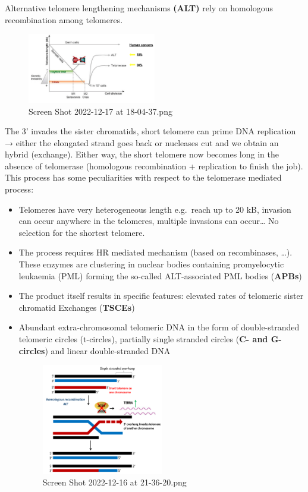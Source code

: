 Alternative telomere lengthening mechanisms \textbf{(ALT) }rely on
homologous recombination among telomeres.

\begin{figure}
\centering
\includegraphics[width=0.5\textwidth]{../_resources/Screen_Shot_2022-12-17_at_18-04-37.png}
\caption{Screen Shot 2022-12-17 at 18-04-37.png}
\end{figure}

The 3' invades the sister chromatids, short telomere can prime DNA
replication → either the elongated strand goes back or nucleases cut and
we obtain an hybrid (exchange). Either way, the short telomere now
becomes long in the absence of telomerase (homologous recombination +
replication to finish the job). This process has some peculiarities with
respect to the telomerase mediated process:

\begin{itemize}
\item
  Telomeres have very heterogeneous length e.g.~reach up to 20 kB,
  invasion can occur anywhere in the telomeres, multiple invasions can
  occur\ldots{} No selection for the shortest telomere.
\item
  The process requires HR mediated mechanism (based on recombinases,
  \ldots). These enzymes are clustering in nuclear bodies containing
  promyelocytic leukaemia (PML) forming the so-called ALT-associated PML
  bodies (\textbf{APBs})
\item
  The product itself results in specific features: elevated rates of
  telomeric sister chromatid Exchanges (\textbf{TSCEs})
\item
  Abundant extra-chromosomal telomeric DNA in the form of
  double-stranded telomeric circles (t-circles), partially single
  stranded circles (\textbf{C- and G-circles}) and linear
  double-stranded DNA

  \begin{figure}
  \centering
  \includegraphics[width=0.5\textwidth]{../_resources/Screen_Shot_2022-12-16_at_21-36-20.png}
  \caption{Screen Shot 2022-12-16 at 21-36-20.png}
  \end{figure}
\end{itemize}

